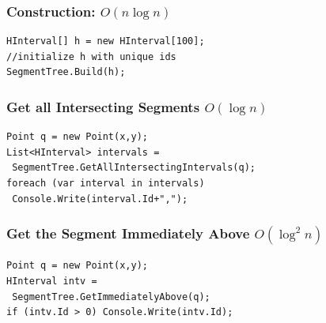 \documentclass{article}
\begin{document}
\subsubsection{Construction: $O(n\log n)$}
\begin{lstlisting}
HInterval[] h = new HInterval[100];
//initialize h with unique ids
SegmentTree.Build(h);
\end{lstlisting}

\subsubsection{Get all Intersecting Segments $O(\log n)$}
\begin{lstlisting}
Point q = new Point(x,y);
List<HInterval> intervals =
 SegmentTree.GetAllIntersectingIntervals(q);
foreach (var interval in intervals) 
 Console.Write(interval.Id+",");
\end{lstlisting}

\subsubsection{Get the Segment Immediately Above $O(\log^2 n)$}
\begin{lstlisting}
Point q = new Point(x,y);
HInterval intv = 
 SegmentTree.GetImmediatelyAbove(q);
if (intv.Id > 0) Console.Write(intv.Id);
\end{lstlisting}
\end{document}
